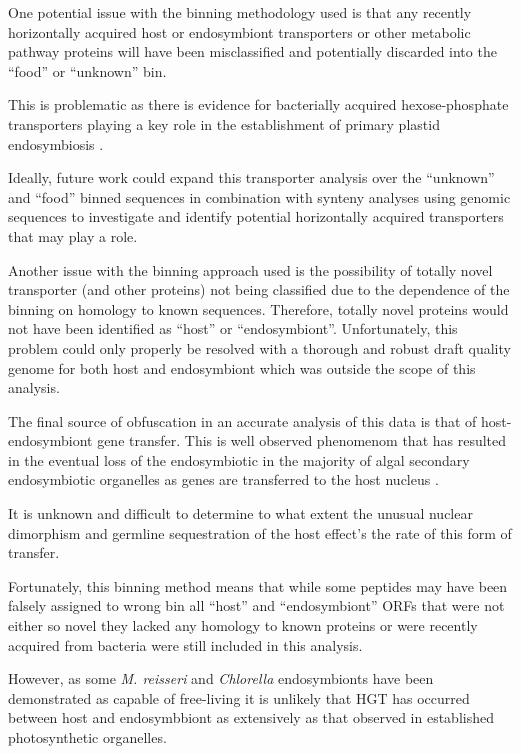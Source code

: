 One potential issue with the binning methodology used is
that any recently horizontally acquired host or endosymbiont 
transporters or other metabolic pathway proteins will have been misclassified
and potentially discarded into the ``food'' or ``unknown'' bin.

This is problematic as there is evidence for bacterially acquired 
hexose-phosphate transporters playing a key role in the 
establishment of primary plastid endosymbiosis \citep{Price2012,Karkar2015a}.

Ideally, future work could expand this transporter analysis over the 
``unknown'' and ``food'' binned sequences in combination with synteny
analyses using genomic sequences to investigate and identify
potential horizontally acquired transporters that may play a role.

Another issue with the binning approach used is the possibility
of totally novel transporter (and other proteins) not being classified
due to the dependence of the binning on homology to known sequences.
Therefore, totally novel proteins would not have been identified as 
``host'' or ``endosymbiont''.  Unfortunately, this problem 
could only properly be resolved with a thorough and robust 
draft quality genome for both host and endosymbiont which was outside
the scope of this analysis. 

The final source of obfuscation in an accurate analysis of this data
is that of host-endosymbiont gene transfer.  
This is well observed phenomenom that has resulted in the eventual loss
of the endosymbiotic in the majority of algal secondary endosymbiotic organelles
as genes are transferred to the host nucleus
\citep{Keeling2008a,Archibald2005,Keeling2004}.

It is unknown and difficult to determine to what extent the 
unusual nuclear dimorphism and germline sequestration of the host 
effect's the rate of this form of transfer. 

Fortunately, this binning method means that while some peptides
may have been falsely assigned to wrong bin all ``host'' and
``endosymbiont'' ORFs that were not either so novel they lacked
any homology to known proteins or were recently acquired from
bacteria were still included in this analysis. 

However, as some \textit{M. reisseri} and \textit{Chlorella} endosymbionts 
have been demonstrated as capable of free-living it is unlikely
that HGT has occurred between host and endosymbbiont as extensively
as that observed in established photosynthetic organelles. 


